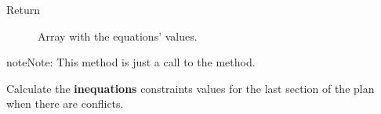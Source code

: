 \documentclass[letterpaper,10pt,english]{sphinxmanual}
\begin{document}
\begin{fulllineitems}
\begin{fulllineitems}
\begin{description}
\item[{Return}] \leavevmode
Array with the equations' values.

\end{description}

\begin{notice}{note}{Note:}
This method is just a call to the {\hyperref[Multi-robot motion planner:planning_sim.Robot._ls_co_criterion]{}} method.
\end{notice}

\end{fulllineitems}


\begin{fulllineitems}
\label{Multi-robot motion planner:planning_sim.Robot._ls_co_fieqcons}
Calculate the \textbf{inequations} constraints values for the last section of the plan when
there are conflicts.


\end{fulllineitems}
\end{fulllineitems}
\end{document}
